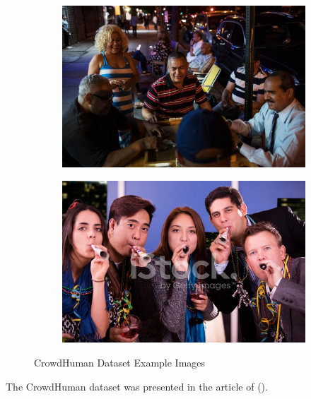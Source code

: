 \begin{figure}[H]
    \centering
    \begin{subfigure}{0.49\textwidth}
        \centering
        \includegraphics[width=\textwidth]{Images/External_datasets/CrowdHuman_1.jpg}
    \end{subfigure}
    \hfill
    \begin{subfigure}{0.49\textwidth}
        \centering
        \includegraphics[width=\textwidth]{Images/External_datasets/CrowdHuman_2.jpg}
    \end{subfigure}
    \caption{\centering CrowdHuman Dataset Example Images}
    \label{fig:CrowdHuman_examples}
\end{figure}


The CrowdHuman dataset was presented in the article of \citeauthor{shao2018crowdhuman} (\citeyear{shao2018crowdhuman}).

